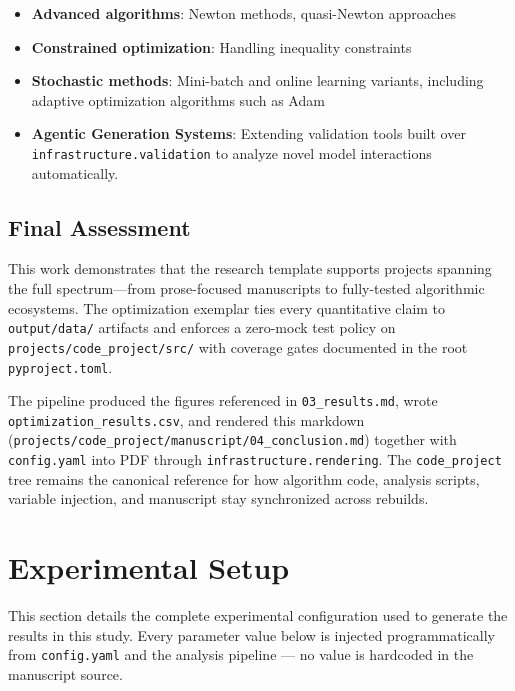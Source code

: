 \documentclass[
]{article}
\providecommand{\tightlist}{%
  \setlength{\itemsep}{0pt}\setlength{\parskip}{0pt}}
\begin{document}
\begin{itemize}
\tightlist
\item
  \textbf{Advanced algorithms}: Newton methods, quasi-Newton approaches
\item
  \textbf{Constrained optimization}: Handling inequality constraints
\item
  \textbf{Stochastic methods}: Mini-batch and online learning variants,
  including adaptive optimization algorithms such as Adam
  \cite{kingma2014adam}
\item
  \textbf{Agentic Generation Systems}: Extending validation tools built
  over \texttt{infrastructure.validation} to analyze novel model
  interactions automatically.
\end{itemize}

\subsection{Final Assessment}\label{final-assessment}

This work demonstrates that the research template supports projects
spanning the full spectrum---from prose-focused manuscripts to
fully-tested algorithmic ecosystems. The optimization exemplar ties
every quantitative claim to \texttt{output/data/} artifacts and enforces
a zero-mock test policy on \texttt{projects/code\_project/src/} with
coverage gates documented in the root \texttt{pyproject.toml}.

The pipeline produced the figures referenced in \texttt{03\_results.md},
wrote \texttt{optimization\_results.csv}, and rendered this markdown
(\texttt{projects/code\_project/manuscript/04\_conclusion.md}) together
with \texttt{config.yaml} into PDF through
\texttt{infrastructure.rendering}. The \texttt{code\_project} tree
remains the canonical reference for how algorithm code, analysis
scripts, variable injection, and manuscript stay synchronized across
rebuilds.

\newpage

\section{Experimental Setup}\label{experimental-setup-1}

This section details the complete experimental configuration used to
generate the results in this study. Every parameter value below is
injected programmatically from \texttt{config.yaml} and the analysis
pipeline --- no value is hardcoded in the manuscript source.
\end{document}
